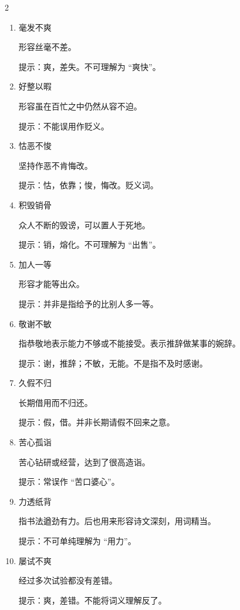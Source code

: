 \documentclass[final,oneside]{ctexbook}
\begin{document}
\begin{multicols}{2}
\begin{enumerate}
      提示：沆瀣，夜间的水气。用作贬义。

    \item 毫发不爽

      形容丝毫不差。

      提示：爽，差失。不可理解为 “爽快”。

    \item 好整以暇

      形容虽在百忙之中仍然从容不迫。

      提示：不能误用作贬义。

    \item 怙恶不悛

      坚持作恶不肯悔改。

      提示：怙，依靠；悛，悔改。贬义词。

    \item 积毁销骨

      众人不断的毁谤，可以置人于死地。

      提示：销，熔化。不可理解为 “出售”。

    \item 加人一等

      形容才能等出众。

      提示：并非是指给予的比别人多一等。

    \item 敬谢不敏

      指恭敬地表示能力不够或不能接受。表示推辞做某事的婉辞。

      提示：谢，推辞；不敏，无能。不是指不及时感谢。

    \item 久假不归

      长期借用而不归还。

      提示：假，借。并非长期请假不回来之意。

    \item 苦心孤诣

      苦心钻研或经营，达到了很高造诣。

      提示：常误作 “苦口婆心”。

    \item 力透纸背

      指书法遒劲有力。后也用来形容诗文深刻，用词精当。

      提示：不可单纯理解为 “用力”。

    \item 屡试不爽

      经过多次试验都没有差错。

      提示：爽，差错。不能将词义理解反了。


\end{enumerate}
\end{multicols}
\end{document}
